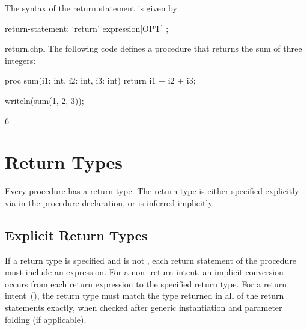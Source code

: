 
The syntax of the return statement is given by
\begin{syntax}
return-statement:
  `return' expression[OPT] ;
\end{syntax}

\begin{chapelexample}{return.chpl}
The following code defines a procedure that returns the sum of three
integers:
\begin{chapel}
proc sum(i1: int, i2: int, i3: int)
  return i1 + i2 + i3;
\end{chapel}
\begin{chapelpost}
writeln(sum(1, 2, 3));
\end{chapelpost}
\begin{chapeloutput}
6
\end{chapeloutput}
\end{chapelexample}


\section{Return Types}
\label{Return_Types}

Every procedure has a return type. The return type is either
specified explicitly via  in the procedure
declaration, or is inferred implicitly.


\subsection{Explicit Return Types}
\label{Explicit_Return_Types}

If a return type is specified and is not ,
each return statement of the procedure must include an expression.
For a non- return intent, an implicit conversion occurs
from each return expression to the specified return type.
For a  return intent~(), the return
type must match the type returned in all of the return statements
exactly, when checked after generic instantiation and parameter folding
(if applicable).


